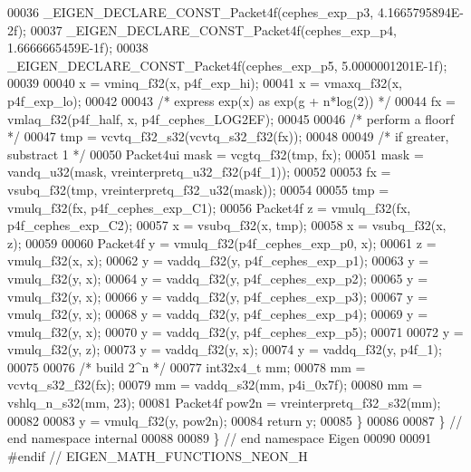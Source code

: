 \begin{DoxyCode}
00036   \_EIGEN\_DECLARE\_CONST\_Packet4f(cephes\_exp\_p3, 4.1665795894E-2f);
00037   \_EIGEN\_DECLARE\_CONST\_Packet4f(cephes\_exp\_p4, 1.6666665459E-1f);
00038   \_EIGEN\_DECLARE\_CONST\_Packet4f(cephes\_exp\_p5, 5.0000001201E-1f);
00039 
00040   x = vminq\_f32(x, p4f\_exp\_hi);
00041   x = vmaxq\_f32(x, p4f\_exp\_lo);
00042 
00043   \textcolor{comment}{/* express exp(x) as exp(g + n*log(2)) */}
00044   fx = vmlaq\_f32(p4f\_half, x, p4f\_cephes\_LOG2EF);
00045 
00046   \textcolor{comment}{/* perform a floorf */}
00047   tmp = vcvtq\_f32\_s32(vcvtq\_s32\_f32(fx));
00048 
00049   \textcolor{comment}{/* if greater, substract 1 */}
00050   Packet4ui mask = vcgtq\_f32(tmp, fx);
00051   mask = vandq\_u32(mask, vreinterpretq\_u32\_f32(p4f\_1));
00052 
00053   fx = vsubq\_f32(tmp, vreinterpretq\_f32\_u32(mask));
00054 
00055   tmp = vmulq\_f32(fx, p4f\_cephes\_exp\_C1);
00056   Packet4f z = vmulq\_f32(fx, p4f\_cephes\_exp\_C2);
00057   x = vsubq\_f32(x, tmp);
00058   x = vsubq\_f32(x, z);
00059 
00060   Packet4f y = vmulq\_f32(p4f\_cephes\_exp\_p0, x);
00061   z = vmulq\_f32(x, x);
00062   y = vaddq\_f32(y, p4f\_cephes\_exp\_p1);
00063   y = vmulq\_f32(y, x);
00064   y = vaddq\_f32(y, p4f\_cephes\_exp\_p2);
00065   y = vmulq\_f32(y, x);
00066   y = vaddq\_f32(y, p4f\_cephes\_exp\_p3);
00067   y = vmulq\_f32(y, x);
00068   y = vaddq\_f32(y, p4f\_cephes\_exp\_p4);
00069   y = vmulq\_f32(y, x);
00070   y = vaddq\_f32(y, p4f\_cephes\_exp\_p5);
00071 
00072   y = vmulq\_f32(y, z);
00073   y = vaddq\_f32(y, x);
00074   y = vaddq\_f32(y, p4f\_1);
00075 
00076   \textcolor{comment}{/* build 2^n */}
00077   int32x4\_t mm;
00078   mm = vcvtq\_s32\_f32(fx);
00079   mm = vaddq\_s32(mm, p4i\_0x7f);
00080   mm = vshlq\_n\_s32(mm, 23);
00081   Packet4f pow2n = vreinterpretq\_f32\_s32(mm);
00082 
00083   y = vmulq\_f32(y, pow2n);
00084   \textcolor{keywordflow}{return} y;
00085 \}
00086 
00087 \} \textcolor{comment}{// end namespace internal}
00088 
00089 \} \textcolor{comment}{// end namespace Eigen}
00090 
00091 \textcolor{preprocessor}{#endif // EIGEN\_MATH\_FUNCTIONS\_NEON\_H}
\end{DoxyCode}
